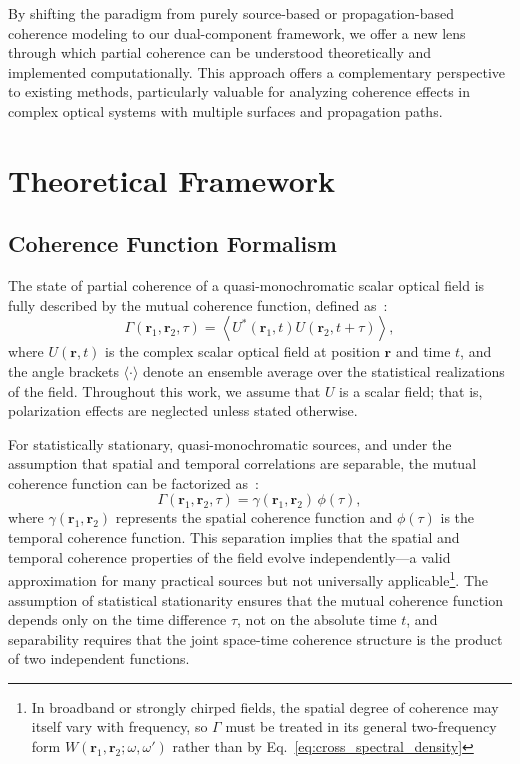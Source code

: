 \documentclass[a4paper,12pt]{article}
\begin{document}
By shifting the paradigm from purely source-based or propagation-based coherence modeling to our dual-component framework, we offer a new lens through which partial coherence can be understood theoretically and implemented computationally. This approach offers a complementary perspective to existing methods, particularly valuable for analyzing coherence effects in complex optical systems with multiple surfaces and propagation paths.


\section{Theoretical Framework}

\subsection{Coherence Function Formalism}

The state of partial coherence of a quasi-monochromatic scalar optical field is fully described by the mutual coherence 
function, defined as~\cite{mandel_wolf, goodman, born1999principles}:
\begin{equation}
\Gamma(\bm{r}_1, \bm{r}_2, \tau) = \left\langle U^*(\bm{r}_1, t) U(\bm{r}_2, t + \tau) \right\rangle,
\end{equation}
where \( U(\bm{r}, t) \) is the complex scalar optical field at position \( \bm{r} \) and time \( t \), and the angle 
brackets \( \langle \cdot \rangle \) denote an ensemble average over the statistical realizations of the field. 
Throughout this work, we assume that \( U \) is a scalar field; that is, polarization effects are neglected unless 
stated otherwise.

For statistically stationary, quasi-monochromatic sources, and under the assumption that spatial and temporal 
correlations are separable, the mutual coherence function can be factorized as~\cite{mandel_wolf}:
\begin{equation}
\Gamma(\bm{r}_1, \bm{r}_2, \tau) = \gamma(\bm{r}_1, \bm{r}_2)\, \phi(\tau),
\label{eq:cross_spectral_density}
\end{equation}
where \( \gamma(\bm{r}_1, \bm{r}_2) \) represents the spatial coherence function and \( \phi(\tau) \) is the 
temporal coherence function. This separation implies that the spatial and temporal coherence properties of the 
field evolve independently—a valid approximation for many practical sources but not universally applicable\footnote{In broadband or strongly chirped fields, the spatial degree of coherence may itself vary with frequency,
so \(\Gamma\) must be treated in its general two-frequency form \(W(\bm r_1,\bm r_2;\omega,\omega')\) rather than 
by Eq.~\ref{eq:cross_spectral_density}}.
The assumption of statistical stationarity ensures that the mutual coherence function depends only on the time
difference \( \tau \), not on the absolute time \( t \), and separability requires that the joint space-time
coherence structure is the product of two independent functions.
\end{document}
